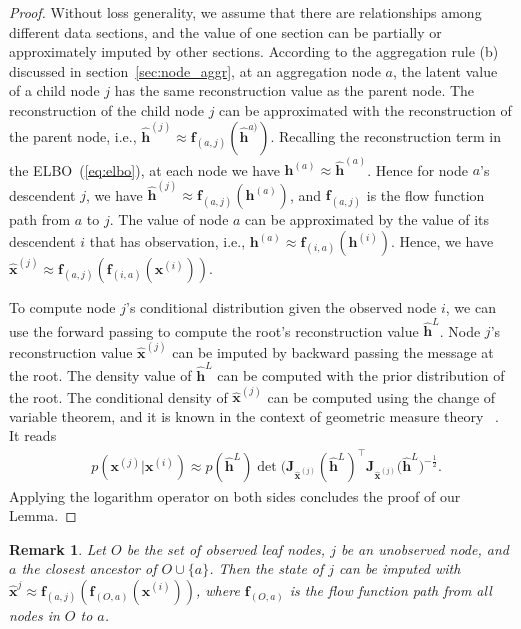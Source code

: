 \documentclass{article}
\newtheorem{remark}{Remark}
\begin{document}
\begin{proof}
Without loss generality, we assume that there are relationships among different data sections, and the value of one section can be partially or approximately imputed by other sections. 
According to the aggregation rule (b) discussed in section~\ref{sec:node_aggr}, at an aggregation node  $a$, the latent value of a child node $j$ has the same reconstruction value as the parent node.  
The reconstruction of the child node $j$ can be approximated with the reconstruction of the parent node, i.e., $\widehat{\mathbf{h}}^{(j)} \approx \mathbf{f}_{(a,j)}(\widehat{\mathbf{h}}^{a)})$. 
Recalling the reconstruction term in the ELBO~(\ref{eq:elbo}), at each node we have $\mathbf{h}^{(a)} \approx \widehat{\mathbf{h}}^{(a)}$. Hence for node $a$'s descendent $j$, we have $\widehat{\mathbf{h}}^{(j)} \approx \mathbf{f}_{(a,j)}(\mathbf{h}^{(a)})$, and $\mathbf{f}_{(a,j)}$ is the flow function path from $a$ to $j$. 
The value of node $a$ can be approximated by the value of its descendent $i$ that has observation, i.e., $\mathbf{h}^{(a)} \approx \mathbf{f}_{(i,a)}(\mathbf{h}^{(i)})$. Hence, we have $\widehat{\mathbf{x}}^{(j)} \approx  \mathbf{f}_{(a,j)}(\mathbf{f}_{(i, a)}(\mathbf{x}^{(i)}))$.

To compute  node $j$'s conditional distribution given the observed node $i$, we can use the forward passing to compute the root's reconstruction  value $\widehat{\mathbf{h}}^L$. 
Node $j$'s reconstruction value $\widehat{\mathbf{x}}^{(j)}$ can be imputed by backward passing the message at the root. The density value of $\widehat{\mathbf{h}}^L$ can be computed with the prior distribution of the root. The conditional density of $\widehat{\mathbf{x}}^{(j)}$ can be computed using the change of variable theorem, and it is known in the context of geometric measure theory ~\cite{Book:Hanson_1994,Article:Krantz_2008}. It reads 
\begin{align*} %
&  p(\mathbf{x}^{(j)} | \mathbf{x}^{(i)} ) \approx p(\widehat{\mathbf{h}}^L)\det\big(\mathbf{J}_{\widehat{\mathbf{x}}^{(j)}}(\widehat{\mathbf{h}}^L)^\top  \mathbf{J}_{\widehat{\mathbf{x}}^{(j)}}(\widehat{\mathbf{h}}^L\big)^{-\frac{1}{2}}.
\end{align*}
Applying the logarithm operator on both sides concludes the proof of our Lemma.
\end{proof}

\begin{remark}\label{rmk:apprx_mulapp}
Let $O$ be the set of observed leaf nodes, $j$ be an unobserved node, and $a$ the closest ancestor of $O \cup \{a\}$. 
Then the state of $j$ can be imputed with $\widehat{\mathbf{x}}^{j} \approx  \mathbf{f}_{(a,j)}(\mathbf{f}_{(O, a)}(\mathbf{x}^{(i)}))$, where $\mathbf{f}_{(O, a)}$ is the flow function path from all nodes in $O$ to $a$.
\end{remark}
\end{document}
